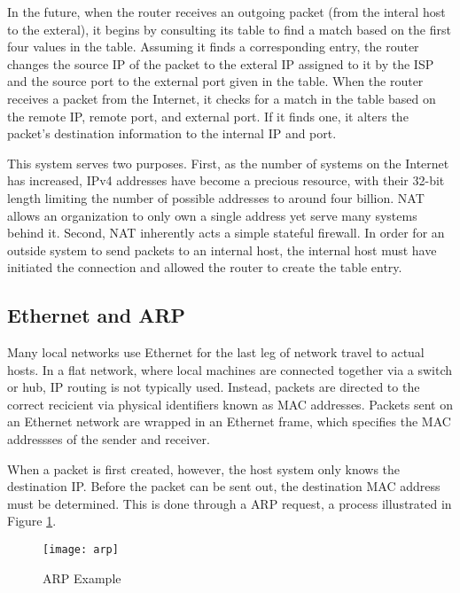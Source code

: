 \par In the future, when the router receives an outgoing packet (from the interal host to the exteral), it begins by consulting its table to find a match based on the first four values in the table. Assuming it finds a corresponding entry, the router changes the source IP of the packet to the exteral IP assigned to it by the \ac{ISP} and the source port to the external port given in the table. When the router receives a packet from the Internet, it checks for a match in the table based on the remote IP, remote port, and external port. If it finds one, it alters the packet's destination information to the internal IP and port.

\par This system serves two purposes. First, as the number of systems on the Internet has increased, \ac{IPv4} addresses have become a precious resource, with their 32-bit length limiting the number of possible addresses to around four billion. \ac{NAT} allows an organization to only own a single address yet serve many systems behind it. Second, \ac{NAT} inherently acts a simple stateful firewall. In order for an outside system to send packets to an internal host, the internal host must have initiated the connection and allowed the router to create the table entry.

\subsection{Ethernet and \acf{ARP}}
\label{sec:eth_routing}
\par Many local networks use Ethernet for the last leg of network travel to actual hosts. In a flat network, where local machines are connected together via a switch or hub, \ac{IP} routing is not typically used. Instead, packets are directed to the correct recicient via physical identifiers known as \ac{MAC} addresses. Packets sent on an Ethernet network are wrapped in an Ethernet frame, which specifies the \ac{MAC} addressses of the sender and receiver.

\par When a packet is first created, however, the host system only knows the destination \ac{IP}. Before the packet can be sent out, the destination \ac{MAC} address must be determined. This is done through a \ac{ARP} request, a process illustrated in Figure \ref{fig:arp_example}.

\begin{figure}[ht]
\caption{\ac{ARP} Example}
\label{fig:arp_example}
\centering
\texttt{[image: arp]}
\end{figure}

